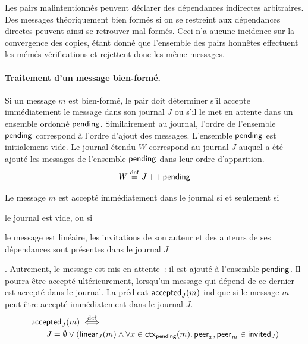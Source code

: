 \begin{remark}
Les pairs malintentionnés peuvent déclarer des dépendances indirectes arbitraires.
Des messages théoriquement bien formés si on se restreint aux dépendances directes peuvent ainsi se retrouver mal-formés.
Ceci n'a aucune incidence sur la convergence des copies, étant donné que l'ensemble des pairs honnêtes effectuent les mémés vérifications et rejettent donc les même messages.
\end{remark}


\paragraph{Traitement d'un message bien-formé.} Si un message $m$ est bien-formé, le pair doit déterminer s'il accepte immédiatement le message dans son journal $J$ ou s'il le met en attente dans un ensemble ordonné $\operatorname{\mathsf{pending}}$.
Similairement au journal, l'ordre de l'ensemble $\operatorname{\mathsf{pending}}$ correspond à l'ordre d'ajout des messages.
L'ensemble $\operatorname{\mathsf{pending}}$ est initialement vide.
Le journal étendu $W$ correspond au journal $J$ auquel a été ajouté les messages de l'ensemble $\operatorname{\mathsf{pending}}$ dans leur ordre d'apparition.
%
\begin{equation*}
    W \overset{\mathrm{def}}{=} J \operatorname{++} \operatorname{\mathsf{pending}}
\end{equation*}

Le message $m$ est accepté immédiatement dans le journal si et seulement si \begin{inlinelist}\item le journal est vide, ou si \item le message est linéaire, les invitations de son auteur et des auteurs de ses dépendances sont présentes dans le journal $J$\end{inlinelist}.
Autrement, le message est mis en attente~: il est ajouté à l'ensemble $\operatorname{\mathsf{pending}}$.
Il pourra être accepté ultérieurement, lorsqu'un message qui dépend de ce dernier est accepté dans le journal.
La prédicat $\operatorname{\mathsf{accepted}}_J(m)$ indique si le message $m$ peut être accepté immédiatement dans le journal $J$.
%
\begin{equation}\begin{split}
    \MoveEqLeft\trm{accepted}_J(m) \defiff\\
    &J = \emptyset \lor (\trm{linear}_J(m) \land \forall x \in \trm{ctx}_{\trm{pending}}(m) \qsep \trm{peer}_x, \trm{peer}_m \in \trm{invited}_J)
\end{split}\end{equation}

